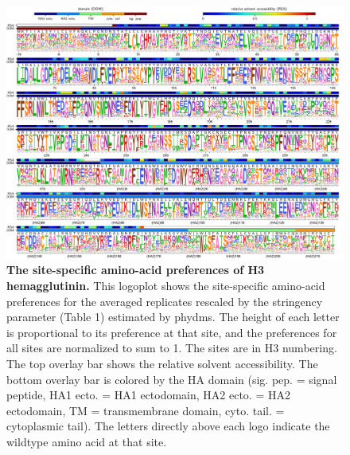 \documentclass[11pt]{article}
\begin{document}
\begin{figure}
\centerline{\includegraphics[width=\textwidth]{figs/prefslogoplot/rescaled-avgprefs_prefs.pdf}}
\caption{\label{fig:logoplot}
{\bf The site-specific amino-acid preferences of H3 hemagglutinin.}
This logoplot shows the site-specific amino-acid preferences for the averaged replicates rescaled by the stringency parameter (Table 1) estimated by phydms.
The height of each letter is proportional to its preference at that site, and the preferences for all sites are normalized to sum to 1.
The sites are in H3 numbering.
The top overlay bar shows the relative solvent accessibility.
The bottom overlay bar is colored by the HA domain (sig. pep. = signal peptide, HA1 ecto. = HA1 ectodomain, HA2 ecto. = HA2 ectodomain, TM = transmembrane domain, cyto. tail. = cytoplasmic tail).
The letters directly above each logo indicate the wildtype amino acid at that site.
}
\end{figure}
\end{document}
